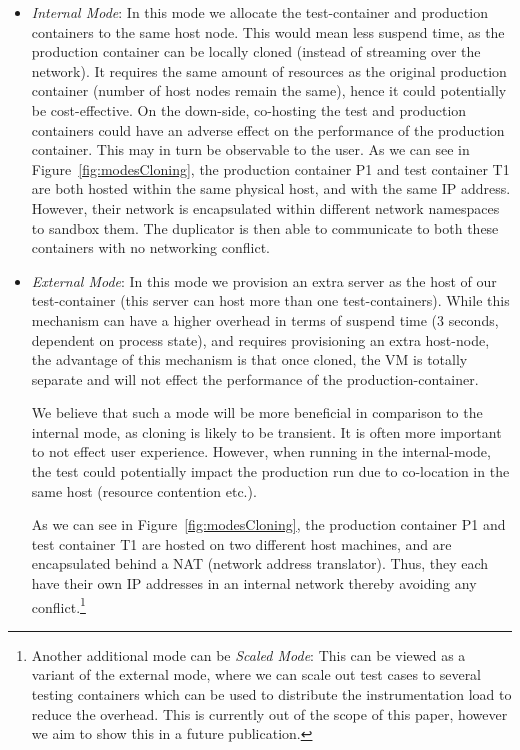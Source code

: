 \begin{itemize}[leftmargin=*,topsep=0pt,itemsep=-1ex,partopsep=1ex,parsep=1ex]

\item \textit{Internal Mode}: In this mode we allocate the test-container and  production containers to the same host node. 
This would mean less suspend time, as the production container can be locally cloned (instead of streaming over the network). 
It requires the same amount of resources as the original production container (number of host nodes remain the same), 
hence it could potentially be cost-effective.
On the down-side, co-hosting the test and production containers could have an adverse effect on the performance of the production container.
This may in turn be observable to the user.
As we can see in Figure~\ref{fig:modesCloning}, the production container P1 and test container T1 are both hosted within the same physical host, and with the same IP address.
However, their network is encapsulated within different network namespaces to sandbox them.
The duplicator is then able to communicate to both these containers with no networking conflict.

\item \textit{External Mode}: In this mode we provision an extra server as the host of our test-container (this server can host more than one test-containers). 
While this mechanism can have a higher overhead in terms of suspend time (3 seconds, dependent on process state), and requires provisioning an extra host-node, the advantage of this mechanism is that once cloned, the VM is totally separate and will not effect the performance of the production-container.

We believe that such a mode will be more beneficial in comparison to the internal mode, as cloning is likely to be transient. 
It is often more important to not effect user experience. 
However, when running in the internal-mode, the test could potentially 
impact the production run due to co-location in the same host 
(resource contention etc.).

As we can see in Figure~\ref{fig:modesCloning}, the production container P1 and test container T1 are hosted on two different host machines, and are encapsulated behind a NAT\cite{nat} (network address translator).
Thus, they each have their own IP addresses in an internal network thereby avoiding any 
conflict.\footnote{Another additional mode can be \textit{Scaled Mode}: This can be viewed as a variant of the external mode, where we can scale out test cases to several testing containers which can be used to distribute the instrumentation load to reduce the overhead. This is currently out of the scope of this paper, however we aim to show this in a future publication.}

\end{itemize}

